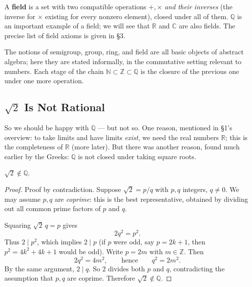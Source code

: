 \documentclass[11pt]{report}
\begin{document}
\begin{defbox}[Field]
A \textbf{field} is a set with two compatible operations $+, \times$ \emph{and their inverses} (the inverse for $\times$ existing for every nonzero element), closed under all of them. $\mathbb{Q}$ is an important example of a field; we will see that $\mathbb{R}$ and $\mathbb{C}$ are also fields. The precise list of field axioms is given in \S 3.
\end{defbox}

\begin{rembox}
The notions of semigroup, group, ring, and field are all basic objects of abstract algebra; here they are stated informally, in the commutative setting relevant to numbers. Each stage of the chain $\mathbb{N} \subset \mathbb{Z} \subset \mathbb{Q}$ is the closure of the previous one under one more operation.
\end{rembox}

\subsection{$\sqrt{2}$ Is Not Rational}

So we should be happy with $\mathbb{Q}$ --- but not so. One reason, mentioned in \S 1's overview: to take limits and have limits \emph{exist}, we need the real numbers $\mathbb{R}$; this is the completeness of $\mathbb{R}$ (more later). But there was another reason, found much earlier by the Greeks: $\mathbb{Q}$ is not closed under taking square roots.

\begin{thmbox}
$\sqrt{2} \notin \mathbb{Q}$.
\end{thmbox}

\begin{proof}
Proof by contradiction. Suppose $\sqrt{2} = p/q$ with $p, q$ integers, $q \neq 0$. We may assume $p, q$ are \emph{coprime}: this is the best representative, obtained by dividing out all common prime factors of $p$ and $q$.

Squaring $\sqrt{2}\, q = p$ gives
\[
2q^2 = p^2.
\]
Thus $2 \mid p^2$, which implies $2 \mid p$ (if $p$ were odd, say $p = 2k+1$, then $p^2 = 4k^2 + 4k + 1$ would be odd). Write $p = 2m$ with $m \in \mathbb{Z}$. Then
\[
2q^2 = 4m^2, \qquad \text{hence} \qquad q^2 = 2m^2.
\]
By the same argument, $2 \mid q$. So $2$ divides both $p$ and $q$, contradicting the assumption that $p, q$ are coprime. Therefore $\sqrt{2} \notin \mathbb{Q}$.
\end{proof}
\end{document}

